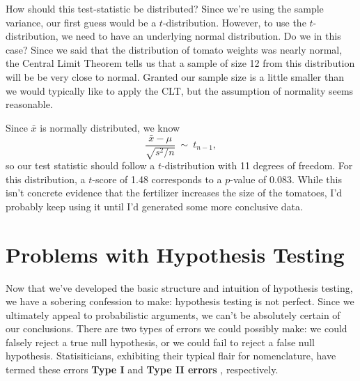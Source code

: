 How should this test-statistic be distributed?  Since we're using the sample variance, our first guess would be a $t$-distribution.  However, to use the $t$-distribution, we need to have an underlying normal distribution.  Do we in this case?  Since we said  that the distribution of tomato weights was nearly normal, the Central Limit Theorem tells us that a sample of size 12 from this distribution will be be very close to normal.  Granted our sample size is a little smaller than we would typically like to apply the CLT, but the assumption of normality seems reasonable.

Since $\bar{x}$ is normally distributed, we know
\begin{equation*}
\frac{\bar{x}-\mu}{\sqrt{s^2/n}} \ \sim \  t_{n-1},
\end{equation*}
so our test statistic should follow a $t$-distribution with 11 degrees of freedom.  For this distribution, a $t$-score of 1.48 corresponds to a $p$-value of 0.083.  While this isn't concrete evidence that the fertilizer increases the size of the tomatoes, I'd probably keep using it until I'd generated some more conclusive data.


\section{Problems with Hypothesis Testing} \label{sec: Hypothesis Probs}


Now that we've developed the basic structure and intuition of hypothesis testing, we have a sobering confession to make: hypothesis testing is not perfect. Since we ultimately appeal to probabilistic arguments, we can't be absolutely certain of our conclusions. There are two types of errors we could possibly make: we could falsely reject a true null hypothesis, or we could fail to reject a false null hypothesis. Statisiticians, exhibiting their typical flair for nomenclature, have termed these errors \textbf{Type I} and \textbf{Type II errors} , respectively.

